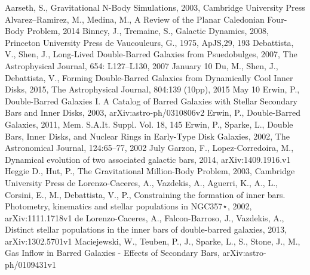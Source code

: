 \documentclass[a4paper,12pt]{article}
\begin{document}
\newpage
\begin{thebibliography}{1}
Aarseth, S., Gravitational N-Body Simulations, 2003, Cambridge University Press
Alvarez–Ramirez, M., Medina, M., A Review of the Planar Caledonian Four-Body Problem, 2014
Binney, J., Tremaine, S., Galactic Dynamics, 2008, Princeton University Press
de Vaucouleurs, G., 1975, ApJS,29, 193
Debattista, V., Shen, J., Long-Lived Double-Barred Galaxies from Psuedobulges, 2007, The Astrophysical Journal, 654: L127–L130, 2007 January 10
Du, M., Shen, J., Debattista, V., Forming Double-Barred Galaxies from Dynamically Cool Inner Disks, 2015, The Astrophysical Journal, 804:139 (10pp), 2015 May 10 
Erwin, P., Double-Barred Galaxies I. A Catalog of Barred Galaxies with Stellar Secondary Bars and Inner Disks, 2003, arXiv:astro-ph/0310806v2
Erwin, P., Double-Barred Galaxies, 2011, Mem. S.A.It. Suppl. Vol. 18, 145
Erwin, P., Sparke, L., Double Bars, Inner Disks, and Nuclear Rings in Early-Type Disk Galaxies, 2002, The Astronomical Journal, 124:65–77, 2002 July
Garzon, F., Lopez-Corredoira, M., Dynamical evolution of two associated galactic bars, 2014, arXiv:1409.1916.v1
Heggie D., Hut, P., The Gravitational Million-Body Problem, 2003, Cambridge University Press
de Lorenzo-Caceres, A., Vazdekis, A., Aguerri, K., A., L., Corsini, E., M., Debattista, V., P., Constraining the formation of inner bars. Photometry, kinematics and stellar populations in NGC357⋆, 2002, arXiv:1111.1718v1
de Lorenzo-Caceres, A., Falcon-Barroso, J., Vazdekis, A., Distinct stellar populations in the inner bars of double-barred galaxies, 2013, arXiv:1302.5701v1
Maciejewski, W., Teuben, P., J., Sparke, L., S., Stone, J., M., Gas Inflow in Barred Galaxies - Effects of Secondary Bars, arXiv:astro-ph/0109431v1

\end{thebibliography}
\end{document}
